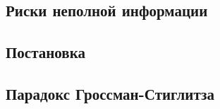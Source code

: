 

\subsection{Риски неполной информации}



\subsection{Постановка}



\subsection{Парадокс Гроссман-Стиглитза}

